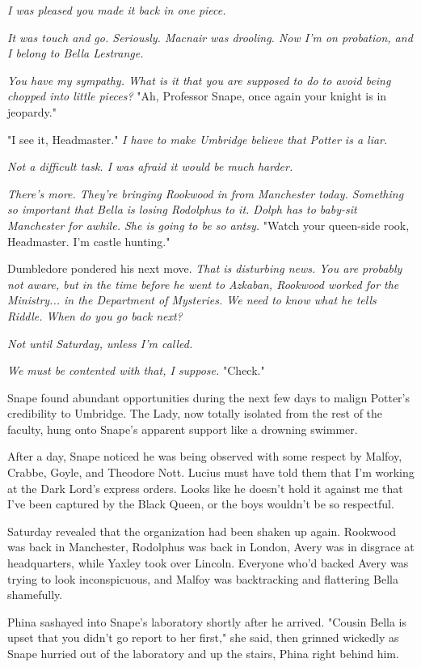 \emph{I was pleased you made it back in one piece.}

\emph{It was touch and go. Seriously. Macnair was drooling. Now I'm on probation, and I belong to Bella Lestrange.}

\emph{You have my sympathy. What is it that you are supposed to do to avoid being chopped into little pieces?} "Ah, Professor Snape, once again your knight is in jeopardy."

"I see it, Headmaster." \emph{I have to make Umbridge believe that Potter is a liar.}

\emph{Not a difficult task. I was afraid it would be much harder.}

\emph{There's more. They're bringing Rookwood in from Manchester today. Something so important that Bella is losing Rodolphus to it. Dolph has to baby-sit Manchester for awhile. She is going to be so antsy.} "Watch your queen-side rook, Headmaster. I'm castle hunting."

Dumbledore pondered his next move. \emph{That is disturbing news. You are probably not aware, but in the time before he went to Azkaban, Rookwood worked for the Ministry... in the Department of Mysteries. We need to know what he tells Riddle. When do you go back next?}

\emph{Not until Saturday, unless I'm called.}

\emph{We must be contented with that, I suppose.} "Check."

Snape found abundant opportunities during the next few days to malign Potter's credibility to Umbridge. The Lady, now totally isolated from the rest of the faculty, hung onto Snape's apparent support like a drowning swimmer.

After a day, Snape noticed he was being observed with some respect by Malfoy, Crabbe, Goyle, and Theodore Nott. Lucius must have told them that I'm working at the Dark Lord's express orders. Looks like he doesn't hold it against me that I've been captured by the Black Queen, or the boys wouldn't be so respectful.

Saturday revealed that the organization had been shaken up again. Rookwood was back in Manchester, Rodolphus was back in London, Avery was in disgrace at headquarters, while Yaxley took over Lincoln. Everyone who'd backed Avery was trying to look inconspicuous, and Malfoy was backtracking and flattering Bella shamefully.

Phina sashayed into Snape's laboratory shortly after he arrived. "Cousin Bella is upset that you didn't go report to her first," she said, then grinned wickedly as Snape hurried out of the laboratory and up the stairs, Phina right behind him.

